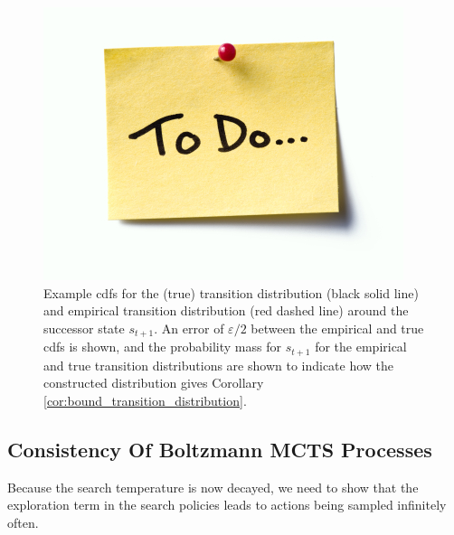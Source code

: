             
            \begin{figure}
                \centering
                \includegraphics[scale=0.4]{figures/todo.jpg}
                \caption{Example cdfs for the (true) transition distribution (black solid line) and empirical transition distribution (red dashed line) around the successor state $s_{t+1}$. An error of $\varepsilon/2$ between the empirical and true cdfs is shown, and the probability mass for $s_{t+1}$ for the empirical and true transition distributions are shown to indicate how the constructed distribution gives Corollary \ref{cor:bound_transition_distribution}.}
                \label{fig:dkw_diag}
            \end{figure}

















    
    \subsection{Consistency Of Boltzmann MCTS Processes}

        Because the search temperature is now decayed, we need to show that the exploration term in the search policies leads to actions being sampled infinitely often.



